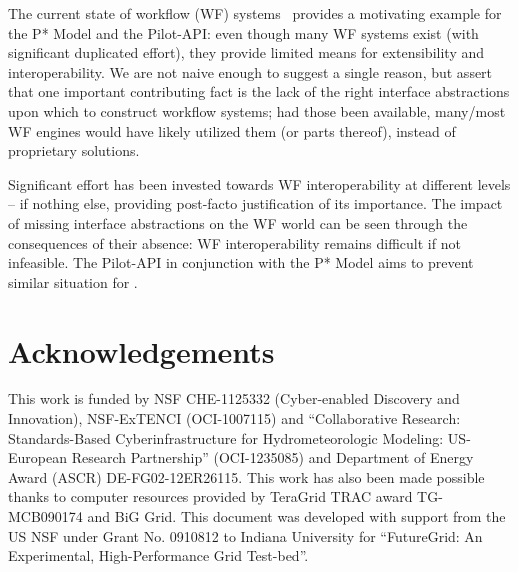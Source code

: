 \documentclass{sig-alternate}
\begin{document}
The current state of workflow (WF) systems~\cite{nsf-workflow,1196459}
provides a motivating example for the P* Model and the Pilot-API: even
though many WF systems exist (with significant duplicated effort),
they provide limited means for extensibility and interoperability.  We
are not naive enough to suggest a single reason, but assert that one
important contributing fact is the lack of the right interface
abstractions upon which to construct workflow systems; had those been
available, many/most WF engines would have likely utilized them (or
parts thereof), instead of proprietary solutions.


Significant effort has been invested towards WF interoperability at
different levels -- if nothing else, providing post-facto
justification of its importance. The impact of missing interface
abstractions on the WF world can be seen through the consequences of
their absence: WF interoperability remains difficult if not
infeasible. The Pilot-API in conjunction with the P* Model aims to
prevent similar situation for \pilotjobs.







\section*{Acknowledgements}
\footnotesize{This work is funded by NSF CHE-1125332 (Cyber-enabled
  Discovery and Innovation), NSF-ExTENCI (OCI-1007115) and
  ``Collaborative Research: Standards-Based Cyberinfrastructure for
  Hydrometeorologic Modeling: US-European Research Partnership''
  (OCI-1235085) and Department of Energy Award (ASCR)
  DE-FG02-12ER26115.  This work has also been made possible thanks to
  computer resources provided by TeraGrid TRAC award TG-MCB090174 and
  BiG Grid.  This document was developed with support from the US NSF
  under Grant No. 0910812 to Indiana University for ``FutureGrid: An
  Experimental, High-Performance Grid Test-bed''.}

% 


\end{document}
